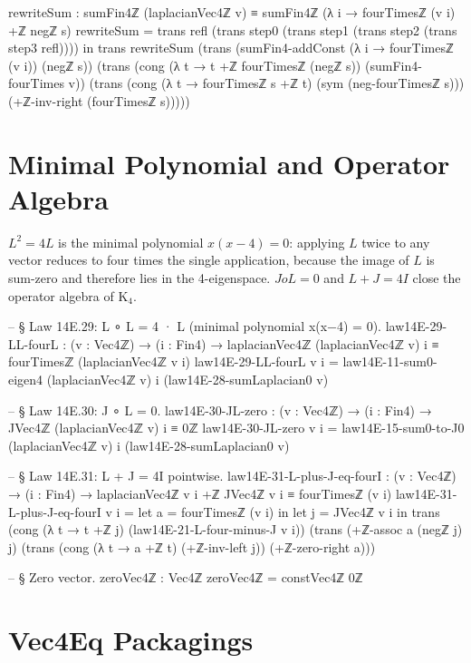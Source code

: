\documentclass[11pt,a4paper]{book}
\def\circ{o}%
\begin{document}
\begin{code}
    rewriteSum :
      sumFin4ℤ (laplacianVec4ℤ v) ≡
      sumFin4ℤ (λ i → fourTimesℤ (v i) +ℤ negℤ s)
    rewriteSum =
      trans
        refl
        (trans step0 (trans step1 (trans step2 (trans step3 refl))))
  in
  trans
    rewriteSum
    (trans
      (sumFin4-addConst (λ i → fourTimesℤ (v i)) (negℤ s))
      (trans
        (cong (λ t → t +ℤ fourTimesℤ (negℤ s)) (sumFin4-fourTimes v))
        (trans
          (cong (λ t → fourTimesℤ s +ℤ t) (sym (neg-fourTimesℤ s)))
          (+ℤ-inv-right (fourTimesℤ s)))))
\end{code}

\section{Minimal Polynomial and Operator Algebra}

$L^2 = 4L$ is the minimal polynomial $x(x - 4) = 0$: applying $L$ twice to any vector reduces to four times the single application, because the image of $L$ is sum-zero and therefore lies in the 4-eigenspace.
$J \circ L = 0$ and $L + J = 4I$ close the operator algebra of K$_4$.

\begin{code}
-- § Law 14E.29: L ∘ L = 4 · L (minimal polynomial x(x−4) = 0).
law14E-29-LL-fourL : (v : Vec4ℤ) → (i : Fin4) →
  laplacianVec4ℤ (laplacianVec4ℤ v) i ≡ fourTimesℤ (laplacianVec4ℤ v i)
law14E-29-LL-fourL v i =
  law14E-11-sum0-eigen4 (laplacianVec4ℤ v) i (law14E-28-sumLaplacian0 v)

-- § Law 14E.30: J ∘ L = 0.
law14E-30-JL-zero : (v : Vec4ℤ) → (i : Fin4) →
  JVec4ℤ (laplacianVec4ℤ v) i ≡ 0ℤ
law14E-30-JL-zero v i =
  law14E-15-sum0-to-J0 (laplacianVec4ℤ v) i (law14E-28-sumLaplacian0 v)

-- § Law 14E.31: L + J = 4I pointwise.
law14E-31-L-plus-J-eq-fourI : (v : Vec4ℤ) → (i : Fin4) →
  laplacianVec4ℤ v i +ℤ JVec4ℤ v i ≡ fourTimesℤ (v i)
law14E-31-L-plus-J-eq-fourI v i =
  let a = fourTimesℤ (v i) in
  let j = JVec4ℤ v i in
  trans
    (cong (λ t → t +ℤ j) (law14E-21-L-four-minus-J v i))
    (trans
      (+ℤ-assoc a (negℤ j) j)
      (trans
        (cong (λ t → a +ℤ t) (+ℤ-inv-left j))
        (+ℤ-zero-right a)))

-- § Zero vector.
zeroVec4ℤ : Vec4ℤ
zeroVec4ℤ = constVec4ℤ 0ℤ
\end{code}

\section{Vec4Eq Packagings}
\end{document}
